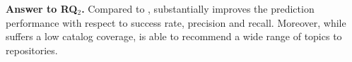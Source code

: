 


\begin{tcolorbox}[boxrule=0.86pt,left=0.3em, right=0.3em,top=0.1em, bottom=0.05em]
\textbf{Answer to RQ$_2$.} Compared to \MNB, \TFb substantially improves the prediction performance with respect to success rate, precision and recall. Moreover, while \MNB suffers a low catalog coverage, \TFb is able to recommend a wide range of topics to repositories.
\end{tcolorbox}










